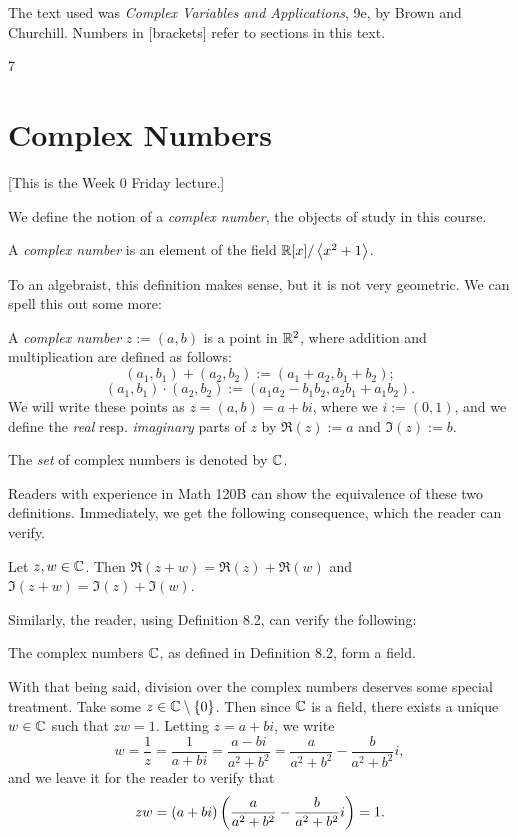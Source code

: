\documentclass{article}
\begin{document}
The text used was \textit{Complex Variables and Applications}, 9e, by Brown and Churchill. Numbers in [brackets] refer to sections in this text.

\setcounter{section}7
\section{Complex Numbers}
[This is the Week 0 Friday lecture.]

We define the notion of a \textit{complex number}, the objects of study in this course.
\begin{definition}
A \textit{complex number} is an element of the field $\mathbb R[x]/\left\langle x^2+1\right\rangle$.
\end{definition}
To an algebraist, this definition makes sense, but it is not very geometric. We can spell this out some more:
\begin{definition}
A \textit{complex number} $z := (a,b)$ is a point in $\mathbb R^2$, where addition and multiplication are defined as follows:
$$(a_1, b_1) + (a_2, b_2) := (a_1+a_2, b_1+b_2);$$
$$(a_1, b_1)\cdot (a_2, b_2) := (a_1a_2 - b_1b_2, a_2b_1 + a_1b_2).$$
We will write these points as $z = (a,b) = a + bi$, where we $i := (0, 1)$, and we define the \textit{real} resp. \textit{imaginary} parts of $z$ by $\Re(z) := a$ and $\Im(z) := b$.

The \textit{set} of complex numbers is denoted by $\mathbb C$.
\end{definition}
Readers with experience in Math 120B can show the equivalence of these two definitions. Immediately, we get the following consequence, which the reader can verify.
\begin{proposition}
Let $z,w\in\mathbb C$. Then $\Re(z+w) = \Re(z) + \Re(w)$ and $\Im(z+w) = \Im(z) + \Im(w)$.
\end{proposition}

Similarly, the reader, using Definition 8.2, can verify the following:
\begin{theorem}
The complex numbers $\mathbb C$, as defined in Definition 8.2, form a field.
\end{theorem}

With that being said, division over the complex numbers deserves some special treatment. Take some $z\in \mathbb C\setminus\{0\}$. Then since $\mathbb C$ is a field, there exists a unique $w\in\mathbb C$ such that $zw = 1$. Letting $z = a+bi$, we write
$$w = \frac 1z = \frac1{a+bi} = \frac{a-bi}{a^2+b^2} = \frac a{a^2+b^2} - \frac{b}{a^2+b^2} i,$$
and we leave it for the reader to verify  that
$$zw = (a+bi)\left(\frac a{a^2+b^2} - \frac b{a^2+b^2}i \right) =1.$$
\end{document}

